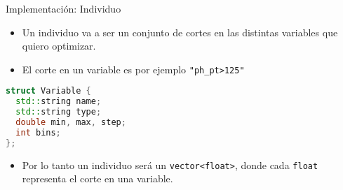 \documentclass[center,10pt,cm]{beamer}
\begin{document}
\begin{frame}[fragile]{Implementaci\'on: Individuo}





  \begin{itemize}\itemsep0.2cm
  \item Un individuo va a ser un conjunto de cortes en las distintas variables que quiero optimizar.
  \item El corte en un variable es por ejemplo \verb|"ph_pt>125"|
  \end{itemize}

  \begin{minipage}{0.7\textwidth}
  \end{minipage}%
  \begin{minipage}{0.3\textwidth}
    \begin{center}
      \begin{lstlisting}[language=c++]
struct Variable {
  std::string name;
  std::string type;
  double min, max, step;
  int bins;
};
      \end{lstlisting}
    \end{center}
  \end{minipage}

  \begin{itemize}\itemsep0.2cm
  \item Por lo tanto un individuo ser\'a un \verb|vector<float>|, donde cada \verb|float| representa el corte en una variable.
  \end{itemize}

  \begin{center}
  
  \end{center}

\end{frame}
\end{document}
